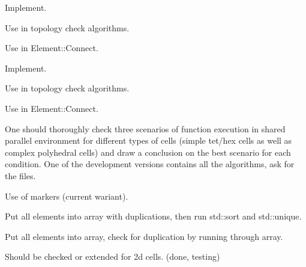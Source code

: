 
\begin{DoxyRefList}
\item[\label{todo__todo000003}%
\hypertarget{todo__todo000003}{}%
Member \hyperlink{classINMOST_1_1Cell_afc84112c4d1f84b15799ffb91615cd30}{I\-N\-M\-O\-S\-T\-:\-:Cell\-:\-:Check\-Edge\-Order} () const ]
\begin{DoxyEnumerate}
\item Implement.
\item Use in topology check algorithms.
\item Use in Element\-::\-Connect.  
\end{DoxyEnumerate}
\item[\label{todo__todo000004}%
\hypertarget{todo__todo000004}{}%
Member \hyperlink{classINMOST_1_1Cell_a84eaa268f8c3886e1164ea14715f2419}{I\-N\-M\-O\-S\-T\-:\-:Cell\-:\-:Fix\-Edge\-Order} () const ]
\begin{DoxyEnumerate}
\item Implement.
\item Use in topology check algorithms.
\item Use in Element\-::\-Connect.  
\end{DoxyEnumerate}
\item[\label{todo__todo000002}%
\hypertarget{todo__todo000002}{}%
Member \hyperlink{classINMOST_1_1Cell_ab0f9c4743826338a4df1b61b69b37c40}{I\-N\-M\-O\-S\-T\-:\-:Cell\-:\-:get\-Edges} () const ]One should thoroughly check three scenarios of function execution in shared parallel environment for different types of cells (simple tet/hex cells as well as complex polyhedral cells) and draw a conclusion on the best scenario for each condition. One of the development versions contains all the algorithms, ask for the files.
\begin{DoxyEnumerate}
\item Use of markers (current wariant).
\item Put all elements into array with duplications, then run std\-::sort and std\-::unique.
\item Put all elements into array, check for duplication by running through array.  
\end{DoxyEnumerate}
\item[\label{todo__todo000006}%
\hypertarget{todo__todo000006}{}%
Member \hyperlink{classINMOST_1_1Cell_a91562ae41d48c2fb99b824b7407659f5}{I\-N\-M\-O\-S\-T\-:\-:Cell\-:\-:Inside} (const real $\ast$point) const ]
\begin{DoxyEnumerate}
\item Should be checked or extended for 2d cells. (done, testing)  

\end{DoxyEnumerate}
\end{DoxyRefList}
